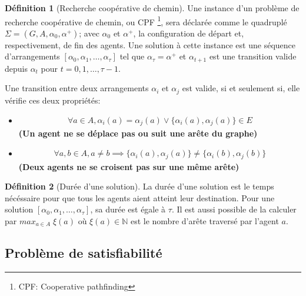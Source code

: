 \documentclass[french, 12pt, letterpaper]{article}
\theoremstyle{definition}
\newtheorem{definition}{Définition}[subsection]
\theoremstyle{proposition}
\theoremstyle{example}
\begin{document}
    \begin{definition}[Recherche coopérative de chemin]
        Une instance d'un problème de recherche coopérative de chemin, ou CPF \footnote{CPF: Cooperative pathfinding}, sera déclarée comme le quadruplé $\Sigma = ( G, A, \alpha_0, \alpha^+ )$;
        avec $\alpha_0$ et $\alpha^+$, la configuration de départ et, respectivement, de fin des agents.
        Une solution à cette instance est une séquence d'arrangements $[\alpha_0, \alpha_1, \ldots, \alpha_\tau]$ tel que $\alpha_\tau = \alpha^+$ 
        et $\alpha_{t+1}$ est une transition valide depuis $\alpha_t$ pour $t=0, 1, \ldots, \tau - 1$.
        
        Une transition entre deux arrangements $\alpha_i$ et $\alpha_j$ est valide, si et seulement si, elle vérifie ces deux propriétés:

        \begin{itemize}
            \item[] 
                \begin{gather}
                    \label{def:deplacement}
                    \forall a \in A, \alpha_i(a) = \alpha_j(a) \lor \{\alpha_i(a),\alpha_j(a)\} \in E
                \end{gather}
                \textbf{(Un agent ne se déplace pas ou suit une arête du graphe)}
            \item[] 
                \begin{gather}
                    \label{def:croisement}
                    \forall a, b \in A, a \neq b \implies \{\alpha_i(a), \alpha_j(a)\} \neq \{\alpha_i(b), \alpha_j(b)\}
                \end{gather}
                \textbf{(Deux agents ne se croisent pas sur une même arête)}
        \end{itemize}
    \end{definition}

    \begin{definition}[Durée d'une solution]
        \label{sec:makespan}
        La durée d'une solution est le temps nécéssaire pour que tous les agents aient atteint leur destination. 
        Pour une solution $[\alpha_0, \alpha_1, \ldots, \alpha_\tau]$, sa durée est égale à $\tau$.
        Il est aussi possible de la calculer par $max_{a \in A}\; \xi(a)$ où $\xi(a) \in \mathbb{N}$ est le nombre d'arête traversé par l'agent $a$.
    \end{definition}

    \subsection{Problème de satisfiabilité}
\end{document}
